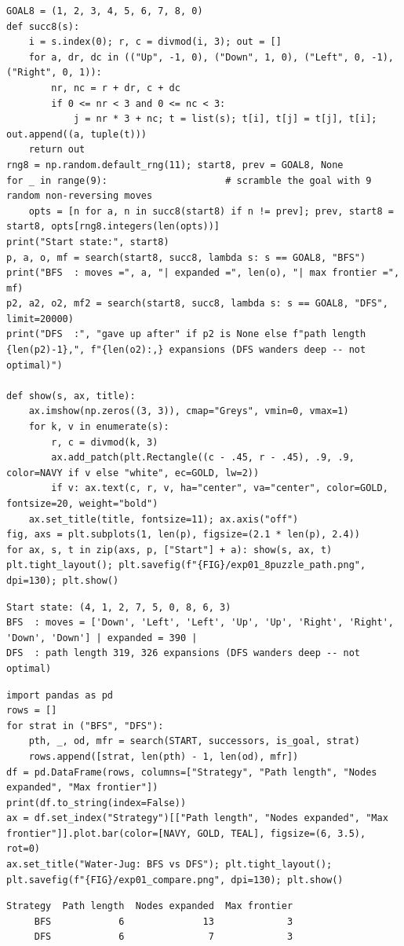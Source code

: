 \documentclass[11pt]{article}
\begin{document}
\begin{lstlisting}[style=py]
GOAL8 = (1, 2, 3, 4, 5, 6, 7, 8, 0)
def succ8(s):
    i = s.index(0); r, c = divmod(i, 3); out = []
    for a, dr, dc in (("Up", -1, 0), ("Down", 1, 0), ("Left", 0, -1), ("Right", 0, 1)):
        nr, nc = r + dr, c + dc
        if 0 <= nr < 3 and 0 <= nc < 3:
            j = nr * 3 + nc; t = list(s); t[i], t[j] = t[j], t[i]; out.append((a, tuple(t)))
    return out
rng8 = np.random.default_rng(11); start8, prev = GOAL8, None
for _ in range(9):                     # scramble the goal with 9 random non-reversing moves
    opts = [n for a, n in succ8(start8) if n != prev]; prev, start8 = start8, opts[rng8.integers(len(opts))]
print("Start state:", start8)
p, a, o, mf = search(start8, succ8, lambda s: s == GOAL8, "BFS")
print("BFS  : moves =", a, "| expanded =", len(o), "| max frontier =", mf)
p2, a2, o2, mf2 = search(start8, succ8, lambda s: s == GOAL8, "DFS", limit=20000)
print("DFS  :", "gave up after" if p2 is None else f"path length {len(p2)-1},", f"{len(o2):,} expansions (DFS wanders deep -- not optimal)")

def show(s, ax, title):
    ax.imshow(np.zeros((3, 3)), cmap="Greys", vmin=0, vmax=1)
    for k, v in enumerate(s):
        r, c = divmod(k, 3)
        ax.add_patch(plt.Rectangle((c - .45, r - .45), .9, .9, color=NAVY if v else "white", ec=GOLD, lw=2))
        if v: ax.text(c, r, v, ha="center", va="center", color=GOLD, fontsize=20, weight="bold")
    ax.set_title(title, fontsize=11); ax.axis("off")
fig, axs = plt.subplots(1, len(p), figsize=(2.1 * len(p), 2.4))
for ax, s, t in zip(axs, p, ["Start"] + a): show(s, ax, t)
plt.tight_layout(); plt.savefig(f"{FIG}/exp01_8puzzle_path.png", dpi=130); plt.show()
\end{lstlisting}
\begin{lstlisting}[style=out]
Start state: (4, 1, 2, 7, 5, 0, 8, 6, 3)
BFS  : moves = ['Down', 'Left', 'Left', 'Up', 'Up', 'Right', 'Right', 'Down', 'Down'] | expanded = 390 | 
DFS  : path length 319, 326 expansions (DFS wanders deep -- not optimal)
\end{lstlisting}
\begin{lstlisting}[style=py]
import pandas as pd
rows = []
for strat in ("BFS", "DFS"):
    pth, _, od, mfr = search(START, successors, is_goal, strat)
    rows.append([strat, len(pth) - 1, len(od), mfr])
df = pd.DataFrame(rows, columns=["Strategy", "Path length", "Nodes expanded", "Max frontier"])
print(df.to_string(index=False))
ax = df.set_index("Strategy")[["Path length", "Nodes expanded", "Max frontier"]].plot.bar(color=[NAVY, GOLD, TEAL], figsize=(6, 3.5), rot=0)
ax.set_title("Water-Jug: BFS vs DFS"); plt.tight_layout(); plt.savefig(f"{FIG}/exp01_compare.png", dpi=130); plt.show()
\end{lstlisting}
\begin{lstlisting}[style=out]
Strategy  Path length  Nodes expanded  Max frontier
     BFS            6              13             3
     DFS            6               7             3
\end{lstlisting}
\end{document}
